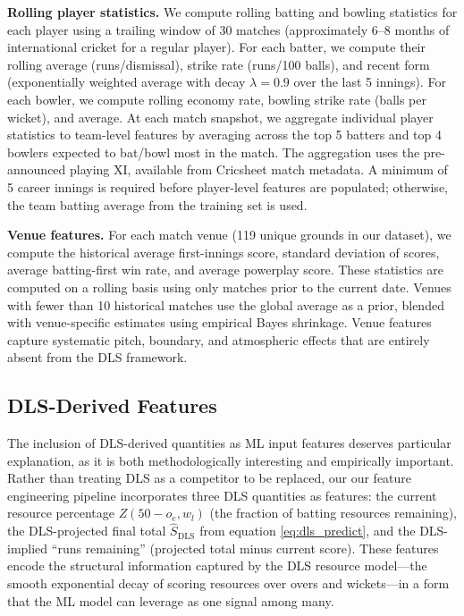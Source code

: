 \documentclass[10pt,a4paper,twocolumn]{article}
\begin{document}
\textbf{Rolling player statistics.} We compute rolling batting and bowling statistics for each player using a trailing window of 30 matches (approximately 6--8 months of international cricket for a regular player). For each batter, we compute their rolling average (runs/dismissal), strike rate (runs/100 balls), and recent form (exponentially weighted average with decay $\lambda = 0.9$ over the last 5 innings). For each bowler, we compute rolling economy rate, bowling strike rate (balls per wicket), and average. At each match snapshot, we aggregate individual player statistics to team-level features by averaging across the top 5 batters and top 4 bowlers expected to bat/bowl most in the match. The aggregation uses the pre-announced playing XI, available from Cricsheet match metadata. A minimum of 5 career innings is required before player-level features are populated; otherwise, the team batting average from the training set is used.

\textbf{Venue features.} For each match venue (119 unique grounds in our dataset), we compute the historical average first-innings score, standard deviation of scores, average batting-first win rate, and average powerplay score. These statistics are computed on a rolling basis using only matches prior to the current date. Venues with fewer than 10 historical matches use the global average as a prior, blended with venue-specific estimates using empirical Bayes shrinkage. Venue features capture systematic pitch, boundary, and atmospheric effects that are entirely absent from the DLS framework.

\subsection{DLS-Derived Features}
\label{sec:dlsfeatures}

The inclusion of DLS-derived quantities as ML input features deserves particular explanation, as it is both methodologically interesting and empirically important. Rather than treating DLS as a competitor to be replaced, our our feature engineering pipeline incorporates three DLS quantities as features: the current resource percentage $Z(50 - o_e, w_l)$ (the fraction of batting resources remaining), the DLS-projected final total $\hat{S}_{\text{DLS}}$ from equation \eqref{eq:dls_predict}, and the DLS-implied ``runs remaining'' (projected total minus current score). These features encode the structural information captured by the DLS resource model---the smooth exponential decay of scoring resources over overs and wickets---in a form that the ML model can leverage as one signal among many.
\end{document}
